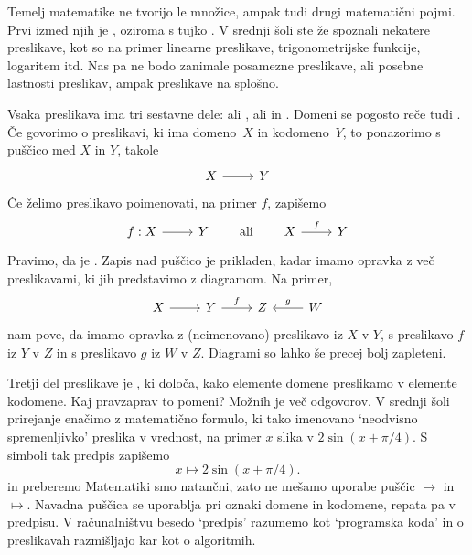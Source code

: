Temelj matematike ne tvorijo le množice, ampak tudi drugi matematični pojmi. Prvi izmed
njih je , oziroma s tujko . V srednji šoli ste že spoznali
nekatere preslikave, kot so na primer linearne preslikave, trigonometrijske funkcije,
logaritem itd. Nas pa ne bodo zanimale posamezne preslikave, ali posebne lastnosti
preslikav, ampak preslikave na splošno.

Vsaka preslikava ima tri sestavne dele:  ali ,
 ali  in . Domeni se pogosto reče tudi
. Če govorimo o preslikavi, ki ima domeno~$X$ in kodomeno~$Y$, to
ponazorimo s puščico med $X$ in $Y$, takole
%
\begin{equation*}
  \begin{tikzcd}
    X \arrow[r] & Y
  \end{tikzcd}
\end{equation*}
%
Če želimo preslikavo poimenovati, na primer $f$, zapišemo
%
\begin{equation*}
  \begin{tikzcd}
    f : X \arrow[r] & Y
  \end{tikzcd}
  \qquad\text{ali}\qquad
  \begin{tikzcd}
    X \arrow[r, "f"] & Y
  \end{tikzcd}
\end{equation*}
%
Pravimo, da je . Zapis nad puščico je prikladen, kadar
imamo opravka z več preslikavami, ki jih predstavimo z diagramom. Na primer,
%
\begin{equation*}
  \begin{tikzcd}
    X \arrow[r] & Y \arrow[r, "f"] & Z & W \arrow[l, "g"{swap}]
  \end{tikzcd}
\end{equation*}
%
nam pove, da imamo opravka z (neimenovano) preslikavo iz $X$ v $Y$, s preslikavo $f$ iz
$Y$ v $Z$ in s preslikavo $g$ iz $W$ v $Z$. Diagrami so lahko še precej bolj zapleteni.

Tretji del preslikave je , ki določa, kako elemente domene preslikamo v elemente
kodomene. Kaj pravzaprav to pomeni? Možnih je več odgovorov. V srednji šoli prirejanje
enačimo z matematično formulo, ki tako imenovano `neodvisno spremenljivko' preslika v vrednost, na primer $x$ slika v
$2 \sin(x + \pi/4)$. S simboli tak predpis zapišemo
%
\begin{equation*}
  x \mapsto 2 \sin(x + \pi/4).
\end{equation*}
%
in preberemo 
%
Matematiki smo natančni, zato ne mešamo uporabe puščic $\to$ in $\mapsto$. Navadna puščica
se uporablja pri oznaki domene in kodomene, repata pa v predpisu. V računalništvu besedo
`predpis' razumemo kot `programska koda' in o preslikavah razmišljajo kar kot o
algoritmih.

